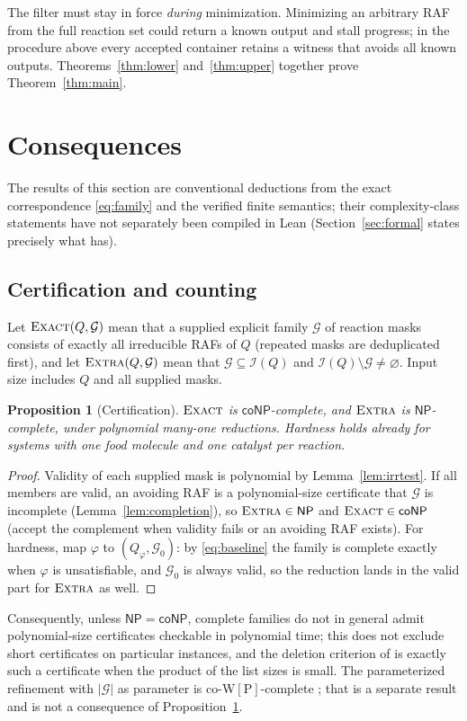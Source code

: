 \documentclass[11pt,a4paper]{article}
\theoremstyle{plain}
\newtheorem{proposition}[theorem]{Proposition}
\theoremstyle{definition}
\theoremstyle{remark}
\newcommand{\Irr}{\mathcal I}
\newcommand{\NP}{\mathsf{NP}}
\newcommand{\coNP}{\mathsf{coNP}}
\newcommand{\Exact}{\textup{\textsc{Exact}}}
\newcommand{\Extra}{\textup{\textsc{Extra}}}
\newcommand{\cG}{\mathcal G}
\begin{document}
The filter must stay in force \emph{during} minimization. Minimizing an arbitrary RAF from the full reaction set could return a known output and stall progress; in the procedure above every accepted container retains a witness that avoids all known outputs. Theorems~\ref{thm:lower} and~\ref{thm:upper} together prove Theorem~\ref{thm:main}.

\section{Consequences}\label{sec:consequences}

The results of this section are conventional deductions from the exact correspondence \eqref{eq:family} and the verified finite semantics; their complexity-class statements have not separately been compiled in Lean (Section~\ref{sec:formal} states precisely what has).

\subsection{Certification and counting}

Let $\Exact(Q,\cG)$ mean that a supplied explicit family $\cG$ of reaction masks consists of exactly all irreducible RAFs of $Q$ (repeated masks are deduplicated first), and let $\Extra(Q,\cG)$ mean that $\cG\subseteq\Irr(Q)$ and $\Irr(Q)\setminus\cG\neq\varnothing$. Input size includes $Q$ and all supplied masks.

\begin{proposition}[Certification]\label{prop:conp}
$\Exact$ is $\coNP$-complete, and $\Extra$ is $\NP$-complete, under polynomial many-one reductions. Hardness holds already for systems with one food molecule and one catalyst per reaction.
\end{proposition}
\begin{proof}
Validity of each supplied mask is polynomial by Lemma~\ref{lem:irrtest}. If all members are valid, an avoiding RAF is a polynomial-size certificate that $\cG$ is incomplete (Lemma~\ref{lem:completion}), so $\Extra\in\NP$ and $\Exact\in\coNP$ (accept the complement when validity fails or an avoiding RAF exists). For hardness, map $\varphi$ to $(Q_\varphi,\cG_0)$: by \eqref{eq:baseline} the family is complete exactly when $\varphi$ is unsatisfiable, and $\cG_0$ is always valid, so the reduction lands in the valid part for $\Extra$ as well.
\end{proof}

Consequently, unless $\NP=\coNP$, complete families do not in general admit polynomial-size certificates checkable in polynomial time; this does not exclude short certificates on particular instances, and the deletion criterion of \cite{steel2013minimal} is exactly such a certificate when the product of the list sizes is small. The parameterized refinement with $|\cG|$ as parameter is co-$\mathrm{W[P]}$-complete \cite{certification2026}; that is a separate result and is not a consequence of Proposition~\ref{prop:conp}.
\end{document}

